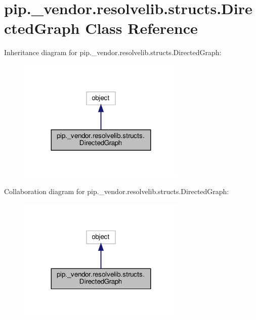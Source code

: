 \hypertarget{classpip_1_1__vendor_1_1resolvelib_1_1structs_1_1DirectedGraph}{}\section{pip.\+\_\+vendor.\+resolvelib.\+structs.\+Directed\+Graph Class Reference}
\label{classpip_1_1__vendor_1_1resolvelib_1_1structs_1_1DirectedGraph}


Inheritance diagram for pip.\+\_\+vendor.\+resolvelib.\+structs.\+Directed\+Graph\+:
\nopagebreak
\begin{figure}[H]
\begin{center}
\leavevmode
\includegraphics[width=227pt]{classpip_1_1__vendor_1_1resolvelib_1_1structs_1_1DirectedGraph__inherit__graph}
\end{center}
\end{figure}


Collaboration diagram for pip.\+\_\+vendor.\+resolvelib.\+structs.\+Directed\+Graph\+:
\nopagebreak
\begin{figure}[H]
\begin{center}
\leavevmode
\includegraphics[width=227pt]{classpip_1_1__vendor_1_1resolvelib_1_1structs_1_1DirectedGraph__coll__graph}
\end{center}
\end{figure}
